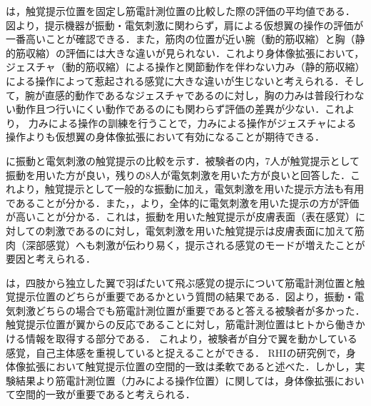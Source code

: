 \begin{small}
        は，触覚提示位置を固定し筋電計測位置の比較した際の評価の平均値である．
        図より，提示機器が振動・電気刺激に関わらず，肩による仮想翼の操作の評価が一番高いことが確認できる．また，筋肉の位置が近い腕（動的筋収縮）と胸（静的筋収縮）の評価には大きな違いが見られない．これより身体像拡張において，ジェスチャ（動的筋収縮）による操作と関節動作を伴わない力み（静的筋収縮）による操作によって惹起される感覚に大きな違いが生じないと考えられる．そして，腕が直感的動作であるなジェスチャであるのに対し，胸の力みは普段行わない動作且つ行いにくい動作であるのにも関わらず評価の差異が少ない．これより，
        力みによる操作の訓練を行うことで，力みによる操作がジェスチャによる操作よりも仮想翼の身体像拡張において有効になることが期待できる．

        に振動と電気刺激の触覚提示の比較を示す．被験者の内，7人が触覚提示として振動を用いた方が良い，残りの8人が電気刺激を用いた方が良いと回答した．これより，触覚提示として一般的な振動に加え，電気刺激を用いた提示方法も有用であることが分かる．また，，より，全体的に電気刺激を用いた提示の方が評価が高いことが分かる．これは，振動を用いた触覚提示が皮膚表面（表在感覚）に対しての刺激であるのに対し，電気刺激を用いた触覚提示は皮膚表面に加えて筋肉（深部感覚）へも刺激が伝わり易く，提示される感覚のモードが増えたことが要因と考えられる．

        は，四肢から独立した翼で羽ばたいて飛ぶ感覚の提示について筋電計測位置と触覚提示位置のどちらが重要であるかという質問の結果である．図より，振動・電気刺激どちらの場合でも筋電計測位置が重要であると答える被験者が多かった．
        触覚提示位置が翼からの反応であることに対し，筋電計測位置はヒトから働きかける情報を取得する部分である．
        これより，被験者が自分で翼を動かしている感覚，自己主体感を重視していると捉えることができる．
        RHIの研究例で，身体像拡張において触覚提示位置の空間的一致は柔軟であると述べた．しかし，実験結果より筋電計測位置（力みによる操作位置）に関しては，身体像拡張において空間的一致が重要であると考えられる．



\end{small}
